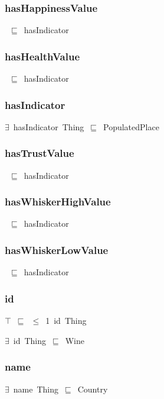 \documentclass{article}
\begin{document}
\subsubsection*{hasHappinessValue}

~\ensuremath{\sqsubseteq}~hasIndicator

\subsubsection*{hasHealthValue}

~\ensuremath{\sqsubseteq}~hasIndicator

\subsubsection*{hasIndicator}

\ensuremath{\exists}~hasIndicator~Thing~\ensuremath{\sqsubseteq}~PopulatedPlace

\subsubsection*{hasTrustValue}

~\ensuremath{\sqsubseteq}~hasIndicator

\subsubsection*{hasWhiskerHighValue}

~\ensuremath{\sqsubseteq}~hasIndicator

\subsubsection*{hasWhiskerLowValue}

~\ensuremath{\sqsubseteq}~hasIndicator

\subsubsection*{id}

\ensuremath{\top}~\ensuremath{\sqsubseteq}~\ensuremath{\leq}~1~id~Thing

\ensuremath{\exists}~id~Thing~\ensuremath{\sqsubseteq}~Wine

\subsubsection*{name}

\ensuremath{\exists}~name~Thing~\ensuremath{\sqsubseteq}~Country
\end{document}
